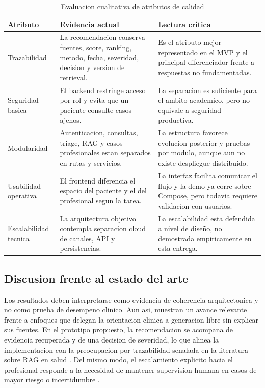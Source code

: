 \documentclass[12pt]{article}
\begin{document}
\begin{table}[ht]
\caption{Evaluacion cualitativa de atributos de calidad}
\label{tab:quality_attributes}
\centering
\begin{tabularx}{\textwidth}{>{\raggedright\arraybackslash}p{2.7cm} >{\raggedright\arraybackslash}p{4.1cm} X}
\toprule
\textbf{Atributo} & \textbf{Evidencia actual} & \textbf{Lectura critica} \\
\midrule
Trazabilidad & La recomendacion conserva fuentes, score, ranking, metodo, fecha, severidad, decision y version de retrieval. & Es el atributo mejor representado en el MVP y el principal diferenciador frente a respuestas no fundamentadas. \\
Seguridad basica & El backend restringe acceso por rol y evita que un paciente consulte casos ajenos. & La separacion es suficiente para el ambito academico, pero no equivale a seguridad productiva. \\
Modularidad & Autenticacion, consultas, triage, RAG y casos profesionales estan separados en rutas y servicios. & La estructura favorece evolucion posterior y pruebas por modulo, aunque aun no existe despliegue distribuido. \\
Usabilidad operativa & El frontend diferencia el espacio del paciente y el del profesional segun la tarea. & La interfaz facilita comunicar el flujo y la demo ya corre sobre Compose, pero todavia requiere validacion con usuarios. \\
Escalabilidad tecnica & La arquitectura objetivo contempla separacion cloud de canales, API y persistencias. & La escalabilidad esta defendida a nivel de diseño, no demostrada empiricamente en esta entrega. \\
\bottomrule
\end{tabularx}
\end{table}

\subsection{Discusion frente al estado del arte}

Los resultados deben interpretarse como evidencia de coherencia arquitectonica y no como prueba de desempeno clinico. Aun asi, muestran un avance relevante frente a enfoques que delegan la orientacion clinica a generacion libre sin explicar sus fuentes. En el prototipo propuesto, la recomendacion se acompana de evidencia recuperada y de una decision de severidad, lo que alinea la implementacion con la preocupacion por trazabilidad senalada en la literatura sobre RAG en salud \cite{neha2024}. Del mismo modo, el escalamiento explicito hacia el profesional responde a la necesidad de mantener supervision humana en casos de mayor riesgo o incertidumbre \cite{minciencias2021}.
\end{document}
